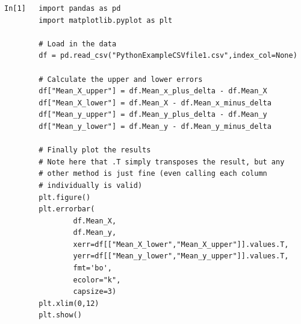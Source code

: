 \begin{lstlisting}[style=PY]
In[1]   import pandas as pd
        import matplotlib.pyplot as plt
        
        # Load in the data
        df = pd.read_csv("PythonExampleCSVfile1.csv",index_col=None)
        
        # Calculate the upper and lower errors
        df["Mean_X_upper"] = df.Mean_x_plus_delta - df.Mean_X
        df["Mean_X_lower"] = df.Mean_X - df.Mean_x_minus_delta
        df["Mean_y_upper"] = df.Mean_y_plus_delta - df.Mean_y
        df["Mean_y_lower"] = df.Mean_y - df.Mean_y_minus_delta
        
        # Finally plot the results
        # Note here that .T simply transposes the result, but any
        # other method is just fine (even calling each column
        # individually is valid)
        plt.figure()
        plt.errorbar(
                df.Mean_X,
                df.Mean_y,
                xerr=df[["Mean_X_lower","Mean_X_upper"]].values.T,
                yerr=df[["Mean_y_lower","Mean_y_upper"]].values.T,
                fmt='bo',
                ecolor="k",
                capsize=3)
        plt.xlim(0,12)
        plt.show()
\end{lstlisting}


